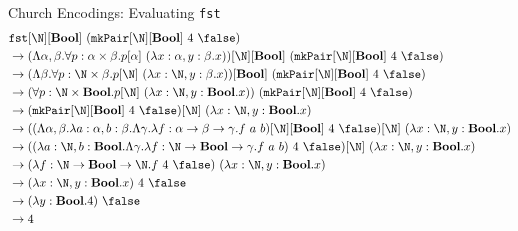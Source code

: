 \documentclass[leqno,presentation,usenames,dvipsnames]{beamer}
\newcommand{\bool}{\textbf{Bool}}
\begin{document}
\begin{frame}{Church Encodings: Evaluating \texttt{fst}}
\footnotesize
\begin{align*}
    &\texttt{fst}[\N][\bool]~(\texttt{mkPair}[\N][\bool]~4~\false) \\
    & \to (\Lambda \alpha, \beta. \forall p : \alpha \times \beta. p[\alpha]~(\lambda x : \alpha, y : \beta. x))[\N][\bool]~(\texttt{mkPair}[\N][\bool]~4~\false) \\
    & \to (\Lambda \beta. \forall p : \N \times \beta. p[\N]~(\lambda x : \N, y : \beta. x))[\bool]~(\texttt{mkPair}[\N][\bool]~4~\false) \\
    & \to (\forall p : \N \times \bool. p[\N]~(\lambda x : \N, y : \bool. x))~(\texttt{mkPair}[\N][\bool]~4~\false) \\
    & \to (\texttt{mkPair}[\N][\bool]~4~\false)[\N]~(\lambda x : \N, y : \bool. x) \\
    & \to ((\Lambda \alpha, \beta. \lambda a : \alpha, b : \beta. \Lambda \gamma. \lambda f : \alpha \to \beta \to \gamma. f~a~b)[\N][\bool]~4~\false)[\N]~(\lambda x : \N, y : \bool. x) \\
    & \to ((\lambda a : \N, b : \bool. \Lambda \gamma. \lambda f : \N \to \bool \to \gamma. f~a~b)~4~\false)[\N]~(\lambda x : \N, y : \bool. x) \\
    & \to (\lambda f : \N \to \bool \to \N. f~4~\false)~(\lambda x : \N, y : \bool. x) \\
    & \to (\lambda x : \N, y : \bool. x)~4~\false \\
    & \to (\lambda y : \bool. 4)~\false \\
    & \to 4 \\
\end{align*}
\end{frame}
\end{document}
